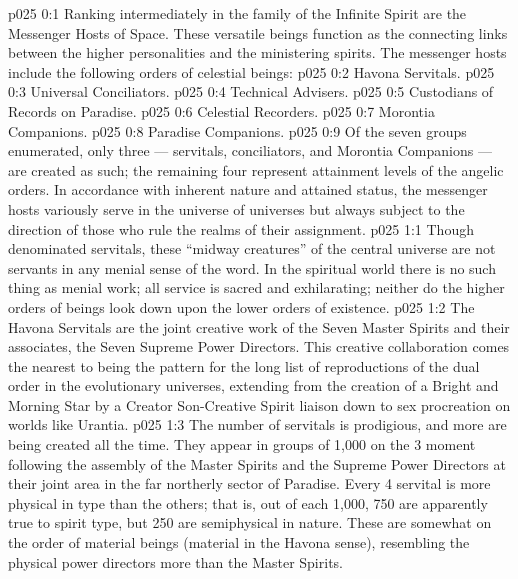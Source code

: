 \author{One High in Authority}
\vs p025 0:1 Ranking intermediately in the family of the Infinite Spirit are the Messenger Hosts of Space. These versatile beings function as the connecting links between the higher personalities and the ministering spirits. The messenger hosts include the following orders of celestial beings:
\vs p025 0:2 \bibnobreakspace Havona Servitals.
\vs p025 0:3 \bibnobreakspace Universal Conciliators.
\vs p025 0:4 \bibnobreakspace Technical Advisers.
\vs p025 0:5 \bibnobreakspace Custodians of Records on Paradise.
\vs p025 0:6 \bibnobreakspace Celestial Recorders.
\vs p025 0:7 \bibnobreakspace Morontia Companions.
\vs p025 0:8 \bibnobreakspace Paradise Companions.
\vs p025 0:9 \pc Of the seven groups enumerated, only three --- servitals, conciliators, and Morontia Companions --- are created as such; the remaining four represent attainment levels of the angelic orders. In accordance with inherent nature and attained status, the messenger hosts variously serve in the universe of universes but always subject to the direction of those who rule the realms of their assignment.
\vs p025 1:1 Though denominated servitals, these “midway creatures” of the central universe are not servants in any menial sense of the word. In the spiritual world there is no such thing as menial work; all service is sacred and exhilarating; neither do the higher orders of beings look down upon the lower orders of existence.
\vs p025 1:2 \pc The Havona Servitals are the joint creative work of the Seven Master Spirits and their associates, the Seven Supreme Power Directors. This creative collaboration comes the nearest to being the pattern for the long list of reproductions of the dual order in the evolutionary universes, extending from the creation of a Bright and Morning Star by a Creator Son\hyp{}Creative Spirit liaison down to sex procreation on worlds like Urantia.
\vs p025 1:3 The number of servitals is prodigious, and more are being created all the time. They appear in groups of 1,000 on the 3 moment following the assembly of the Master Spirits and the Supreme Power Directors at their joint area in the far northerly sector of Paradise. Every 4 servital is more physical in type than the others; that is, out of each 1,000, 750 are apparently true to spirit type, but 250 are semiphysical in nature. These  are somewhat on the order of material beings (material in the Havona sense), resembling the physical power directors more than the Master Spirits.
